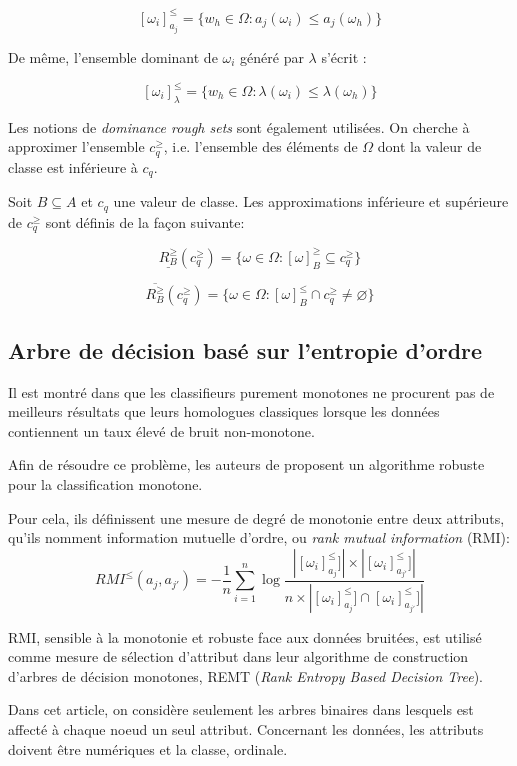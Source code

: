 \documentclass[a4paper]{article}
\begin{document}
$$[\omega_i]^{\leq}_{a_j} = \{w_h \in \Omega : a_j(\omega_i) \leq a_j(\omega_h)\}$$

De même, l'ensemble dominant de $\omega_i$ généré par $\lambda$ s'écrit :

$$[\omega_i]^{\leq}_{\lambda} = \{w_h \in \Omega : \lambda(\omega_i) \leq
\lambda(\omega_h)\}$$ 

Les notions de \emph{dominance rough sets} sont également utilisées. On
cherche à approximer l'ensemble $c^{\geq}_q$, i.e. l'ensemble des éléments de
$\Omega$ dont la valeur de classe est inférieure à $c_q$.

\noindent Soit $B \subseteq A$ et $c_q$ une valeur de classe. Les approximations
inférieure et supérieure de $c^{\geq}_q$ sont définis de la façon suivante:

$$ \underline{R^{\geq}_B}(c^{\geq}_q) = \{\omega \in \Omega :
[\omega]^{\geq}_B \subseteq c^{\geq}_q\}$$

$$ \overline{R^{\geq}_B}(c^{\geq}_q) = \{\omega \in \Omega :
[\omega]^{\leq}_B \cap c^{\geq}_q \neq \varnothing\}$$


\subsection{Arbre de décision basé sur l'entropie d'ordre}
Il est montré dans \cite{ben-adding} que les classifieurs purement monotones ne
procurent pas de meilleurs résultats que leurs homologues classiques lorsque les
données contiennent un taux élevé de bruit non-monotone. 

Afin de résoudre ce problème, les auteurs de \cite{hu-rank} proposent un algorithme robuste pour la
classification monotone.

Pour cela, ils définissent une mesure de degré de monotonie entre deux
attributs, qu'ils nomment information mutuelle d'ordre, ou
\emph{rank mutual information} (RMI): \\
$$ RMI^{\leq}(a_j, a_{j'}) = -\frac{1}{n} \sum_{i=1}^{n} \log
\frac{|[\omega_i]^{\leq}_{a_j}]| \times |[\omega_i]^{\leq}_{a_{j'}}]|}{n \times
|[\omega_i]^{\leq}_{a_j}]\cap [\omega_i]^{\leq}_{a_{j'}}]|}$$

RMI, sensible à la monotonie et robuste face aux données bruitées, est utilisé
comme mesure de sélection d'attribut dans leur algorithme de construction
d'arbres de décision monotones, REMT (\emph{Rank Entropy Based Decision
Tree}).

Dans cet article, on considère seulement les arbres binaires dans lesquels
est affecté à chaque noeud un seul attribut. Concernant les données, les
attributs doivent être numériques et la classe, ordinale.
\end{document}
